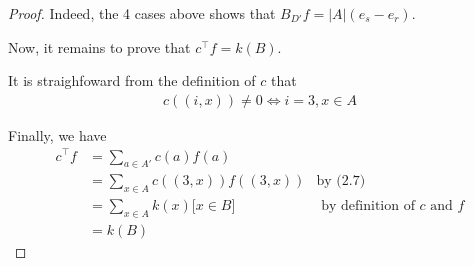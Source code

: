 \documentclass[a4paper,10pt, leqno]{article}
\theoremstyle{definition}
\begin{document}
\begin{proof}
Indeed, the 4 cases above shows that $B_{D'}f = |A|(e_s - e_r)$.

Now, it remains to prove that $c^\intercal f = k(B)$.

It is straighfoward from the definition of $c$ that 
\begin{align*}
 \tag{2.7} c((i, x)) \neq 0 \iff i = 3, x \in A
\end{align*}

Finally, we have
\begin{align*}
 c^\intercal f &= \sum_{a \in A'}{c(a)f(a)} \\
 &= \sum_{x \in A}{c((3, x))f((3, x))} &\text{by (2.7)} \\
  &= \sum_{x \in A}{k(x)\lbrack x \in B \rbrack }  &\text{ by definition of $c$ and $f$} \\
  &= k(B)
\end{align*}
\end{proof}
\end{document}
